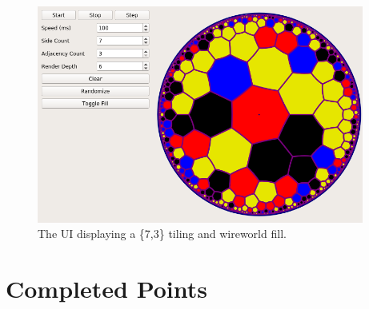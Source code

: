 \documentclass[letterpaper,12pt]{article}
\begin{document}
\begin{figure}[H]
\includegraphics[width=29em]{../media/ui2.png}
\caption{The UI displaying a \{7,3\} tiling and wireworld fill.}
\centering
\end{figure}


\section*{Completed Points}
\end{document}
